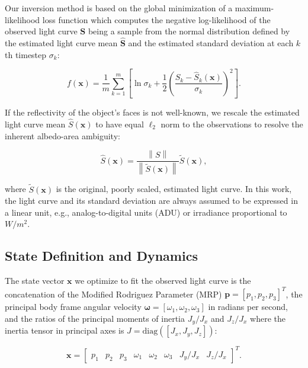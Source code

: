 \documentclass[a4paper,twocolumn]{spaceDebrisC} %
\newcommand{\vctr}[1]{\bm{#1}}
\newcommand{\norm}[1]{\left\lVert#1\right\rVert}
\begin{document}
Our inversion method is based on the global minimization of a maximum-likelihood loss function which computes the negative log-likelihood of the observed light curve $\vctr{S}$ being a sample from the normal distribution defined by the estimated light curve mean $\hat{\vctr{S}}$ and the estimated standard deviation at each $k$th timestep $\sigma_k$:

\begin{equation} \label{eq:nll_loss}
 f(\vctr{x}) = \frac{1}{m}\sum_{k=1}^{m}\left[\ln\sigma_k + \frac{1}{2}\left(\frac{S_k - \hat{S}_k(\vctr{x})}{\sigma_k}\right)^2 \right].
 \end{equation}

If the reflectivity of the object's faces is not well-known, we rescale the estimated light curve mean $\hat{S}(\vctr{x})$ to have equal $\ell_2$ norm to the observations to resolve the inherent albedo-area ambiguity:

\begin{equation}
 \hat{S}(\vctr{x}) = \frac{\norm{S}}{\norm{\tilde{S}(\vctr{x})}} \tilde{S}(\vctr{x}),
\end{equation}

\noindent
where $\tilde{S}(\vctr{x})$ is the original, poorly scaled, estimated light curve. In this work, the light curve and its standard deviation are always assumed to be expressed in a linear unit, e.g., analog-to-digital units (ADU) or irradiance proportional to $W/m^2$.

\subsection{State Definition and Dynamics}

The state vector $\vctr{x}$ we optimize to fit the observed light curve is the concatenation of the Modified Rodriguez Parameter (MRP) $\vctr{p} = [p_1, p_2, p_3]^T$, the principal body frame angular velocity $\vctr{\omega} = [\omega_1, \omega_2, \omega_3]$ in radians per second, and the ratios of the principal moments of inertia $J_y / J_x$ and $J_z / J_x$ where the inertia tensor in principal axes is $J = \mathrm{diag}\left([J_x, J_y, J_z]\right)$:

\begin{equation}
 \vctr{x} = \begin{bmatrix} 
 p_1 & p_2 & p_3 & \omega_1 & \omega_2 & \omega_3 & J_y / J_x & J_z / J_x
  \end{bmatrix}^T.
\end{equation}
\end{document}
